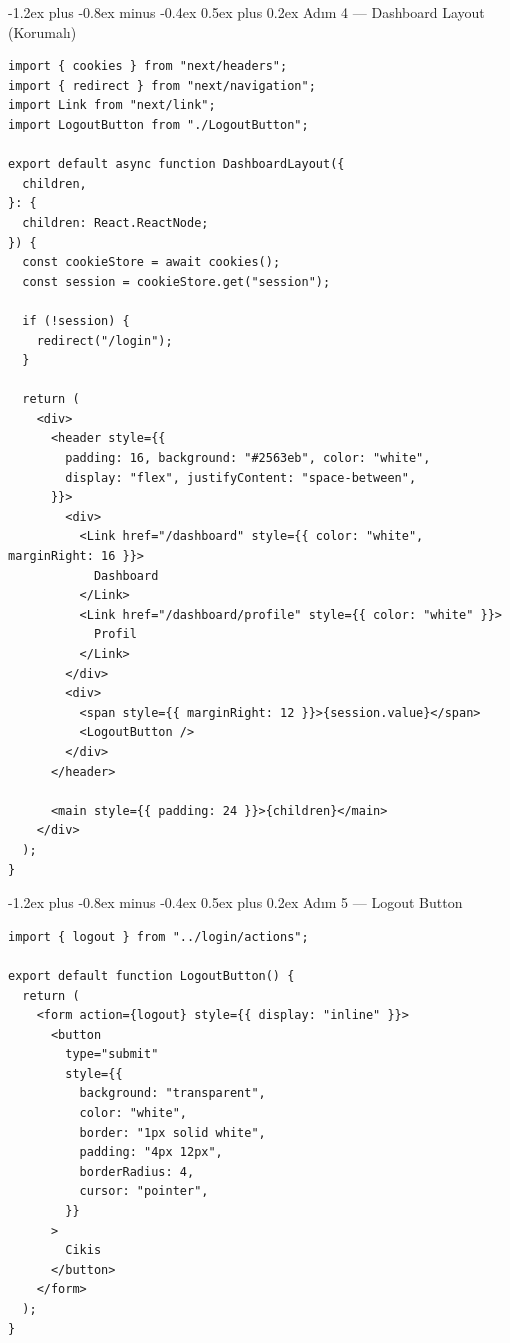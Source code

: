 \documentclass[12pt, a4paper]{article}
\makeatletter
\renewcommand{\subsection}{%
  \@startsection{subsection}{2}{\z@}%
    {-1.2ex plus -0.8ex minus -0.4ex}%
    {0.5ex plus 0.2ex}%
    {\normalfont\large\bfseries\sffamily\color{secondary}}%
}
\makeatother
\begin{document}
\newpage
\subsection{Adım 4 --- Dashboard Layout (Korumalı)}

\begin{tcolorbox}[enhanced, colback=codebg, colframe=gray!30,
    colbacktitle=authcol!85!black, coltitle=white, arc=4pt,
    title={\sffamily\bfseries\small src/app/dashboard/layout.tsx}]
\begin{lstlisting}[style=jsxstyle]
import { cookies } from "next/headers";
import { redirect } from "next/navigation";
import Link from "next/link";
import LogoutButton from "./LogoutButton";

export default async function DashboardLayout({
  children,
}: {
  children: React.ReactNode;
}) {
  const cookieStore = await cookies();
  const session = cookieStore.get("session");

  if (!session) {
    redirect("/login");
  }

  return (
    <div>
      <header style={{
        padding: 16, background: "#2563eb", color: "white",
        display: "flex", justifyContent: "space-between",
      }}>
        <div>
          <Link href="/dashboard" style={{ color: "white", marginRight: 16 }}>
            Dashboard
          </Link>
          <Link href="/dashboard/profile" style={{ color: "white" }}>
            Profil
          </Link>
        </div>
        <div>
          <span style={{ marginRight: 12 }}>{session.value}</span>
          <LogoutButton />
        </div>
      </header>

      <main style={{ padding: 24 }}>{children}</main>
    </div>
  );
}
\end{lstlisting}
\end{tcolorbox}

\subsection{Adım 5 --- Logout Button}

\begin{tcolorbox}[enhanced, colback=codebg, colframe=gray!30,
    colbacktitle=clientcol!85!black, coltitle=white, arc=4pt,
    title={\sffamily\bfseries\small src/app/dashboard/LogoutButton.tsx}]
\begin{lstlisting}[style=jsxstyle]
import { logout } from "../login/actions";

export default function LogoutButton() {
  return (
    <form action={logout} style={{ display: "inline" }}>
      <button
        type="submit"
        style={{
          background: "transparent",
          color: "white",
          border: "1px solid white",
          padding: "4px 12px",
          borderRadius: 4,
          cursor: "pointer",
        }}
      >
        Cikis
      </button>
    </form>
  );
}
\end{lstlisting}
\end{tcolorbox}
\end{document}
